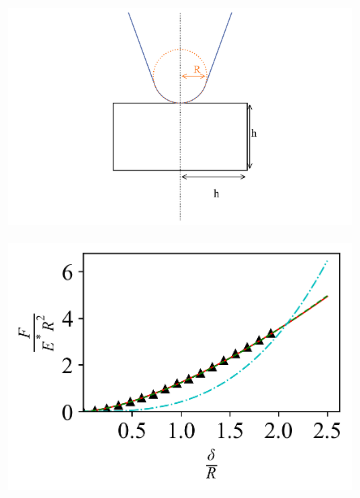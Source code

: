 \begin{figure}[H]
    \begin{subfigure}[t]{0.32\textwidth}
        \centering
        \caption{\label{fig: Capped-Plane-Setup}}
        \includegraphics[width=1\linewidth]{Figures/Capped-Plane-Setup.png}
    \end{subfigure}
    \hfill
    \begin{subfigure}[t]{0.32\textwidth}
        \centering
        \caption{\label{fig: Capped-Plane-Contact_Models}  }
        \includegraphics[width=1\linewidth]{Figures/Capped-Plane-Contact_Models.png}
    \end{subfigure}
    \hfill
    \begin{subfigure}[t]{0.32\textwidth}
        \centering
        \caption{\label{fig: Capped-Plane-Young's_Modulus} }

\end{subfigure}
\end{figure}
